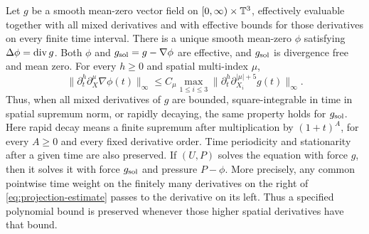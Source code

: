 \begin{lemma}\label{lem:projection}
Let $g$ be a smooth mean-zero vector field on
$[0,\infty)\times\mathbb T^3$, effectively evaluable together with all
mixed derivatives and with effective bounds for those derivatives
on every finite time interval. There is a unique smooth mean-zero
$\phi$ satisfying $\Delta\phi=\operatorname{div} g$. Both $\phi$ and
$g_{\rm sol}=g-\nabla\phi$ are effective, and $g_{\rm sol}$ is
divergence free and mean zero. For every $h\geq0$ and spatial
multi-index $\mu$,
\begin{equation}\label{eq:projection-estimate}
 \|\partial_t^h\partial_X^\mu\nabla\phi(t)\|_\infty
 \leq C_\mu\max_{1\leq i\leq3}
 \|\partial_t^h\partial_{X_i}^{|\mu|+5}g(t)\|_\infty.
\end{equation}
Thus, when all mixed derivatives of $g$ are bounded, square-integrable
in time in spatial supremum norm, or rapidly decaying, the same
property holds for $g_{\rm sol}$. Here rapid decay means a finite
supremum after multiplication by $(1+t)^A$, for every $A\geq0$ and
every fixed derivative order. Time periodicity and stationarity
after a given time are also preserved. If $(U,P)$ solves the equation
with force $g$, then it solves it with force $g_{\rm sol}$ and
pressure $P-\phi$.
More precisely, any common pointwise time weight on the finitely many
derivatives on the right of \eqref{eq:projection-estimate} passes to
the derivative on its left. Thus a specified polynomial bound is
preserved whenever those higher spatial derivatives have that bound.
\end{lemma}
